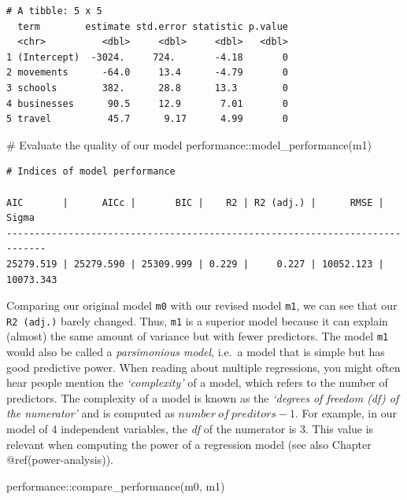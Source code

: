 \documentclass[
  letterpaper,
]{krantz}
\makeatletter
\newenvironment{Shaded}{\begin{snugshade}}{\end{snugshade}}
\newcommand{\CommentTok}[1]{\textcolor[rgb]{0.37,0.37,0.37}{#1}}
\newcommand{\FunctionTok}[1]{\textcolor[rgb]{0.28,0.35,0.67}{#1}}
\newcommand{\NormalTok}[1]{\textcolor[rgb]{0.00,0.23,0.31}{#1}}
\newcommand{\SpecialCharTok}[1]{\textcolor[rgb]{0.37,0.37,0.37}{#1}}
\newenvironment{kframe}{%
\medskip{}
\setlength{\fboxsep}{.8em}
 \def\at@end@of@kframe{}%
 \ifinner\ifhmode%
  \def\at@end@of@kframe{\end{minipage}}%
  \begin{minipage}{\columnwidth}%
 \fi\fi%
 \def\FrameCommand##1{\hskip\@totalleftmargin \hskip-\fboxsep
 \colorbox{shadecolor}{##1}\hskip-\fboxsep
     \hskip-\linewidth \hskip-\@totalleftmargin \hskip\columnwidth}%
 \MakeFramed {\advance\hsize-\width
   \@totalleftmargin\z@ \linewidth\hsize
   \@setminipage}}%
 {\par\unskip\endMakeFramed%
 \at@end@of@kframe}
\renewenvironment{Shaded}{\begin{kframe}}{\end{kframe}}
\makeatother
\begin{document}
\begin{verbatim}
# A tibble: 5 x 5
  term        estimate std.error statistic p.value
  <chr>          <dbl>     <dbl>     <dbl>   <dbl>
1 (Intercept)  -3024.     724.       -4.18       0
2 movements      -64.0     13.4      -4.79       0
3 schools        382.      28.8      13.3        0
4 businesses      90.5     12.9       7.01       0
5 travel          45.7      9.17      4.99       0
\end{verbatim}

\begin{Shaded}
\begin{Highlighting}[]
\CommentTok{\# Evaluate the quality of our model}
\NormalTok{performance}\SpecialCharTok{::}\FunctionTok{model\_performance}\NormalTok{(m1)}
\end{Highlighting}
\end{Shaded}

\begin{verbatim}
# Indices of model performance

AIC       |      AICc |       BIC |    R2 | R2 (adj.) |      RMSE |     Sigma
-----------------------------------------------------------------------------
25279.519 | 25279.590 | 25309.999 | 0.229 |     0.227 | 10052.123 | 10073.343
\end{verbatim}

Comparing our original model \texttt{m0} with our revised model
\texttt{m1}, we can see that our \texttt{R2\ (adj.)} barely changed.
Thus, \texttt{m1} is a superior model because it can explain (almost)
the same amount of variance but with fewer predictors. The model
\texttt{m1} would also be called a \emph{parsimonious model}, i.e.~a
model that is simple but has good predictive power. When reading about
multiple regressions, you might often hear people mention the
\emph{`complexity'} of a model, which refers to the number of
predictors. The complexity of a model is known as the \emph{`degrees of
freedom (df) of the numerator'} and is computed as
\(number\ of\ preditors - 1\). For example, in our model of 4
independent variables, the \emph{df} of the numerator is 3. This value
is relevant when computing the power of a regression model (see also
Chapter @ref(power-analysis)).

\begin{Shaded}
\begin{Highlighting}[]
\NormalTok{performance}\SpecialCharTok{::}\FunctionTok{compare\_performance}\NormalTok{(m0, m1)}
\end{Highlighting}
\end{Shaded}
\end{document}
